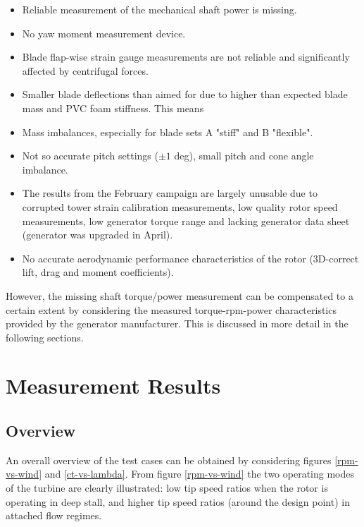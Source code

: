 \documentclass[a4paper]{jpconf}
\begin{document}
\begin{itemize}
	\item Reliable measurement of the mechanical shaft power is missing.
	\item No yaw moment measurement device.
	\item Blade flap-wise strain gauge measurements are not reliable and significantly affected by centrifugal forces.
	\item Smaller blade deflections than aimed for due to higher than expected blade mass and PVC foam stiffness. This means
	\item Mass imbalances, especially for blade sets A "stiff" and B "flexible".
	\item Not so accurate pitch settings ($\pm 1$ deg), small pitch and cone angle imbalance.
	\item The results from the February campaign are largely unusable due to corrupted tower strain calibration measurements, low quality rotor speed measurements, low generator torque range and lacking generator data sheet (generator was upgraded in April).
	\item No accurate aerodynamic performance characteristics of the rotor (3D-correct lift, drag and moment coefficients).
\end{itemize}

However, the missing shaft torque/power measurement can be compensated to a certain extent by considering the measured torque-rpm-power characteristics provided by the generator manufacturer. This is discussed in more detail in the following sections.


\section{Measurement Results}

\subsection{Overview}

An overall overview of the test cases can be obtained by considering figures \ref{rpm-vs-wind} and \ref{ct-vs-lambda}. From figure \ref{rpm-vs-wind} the two operating modes of the turbine are clearly illustrated: low tip speed ratios when the rotor is operating in deep stall, and higher tip speed ratios (around the design point) in attached flow regimes. 
\end{document}
